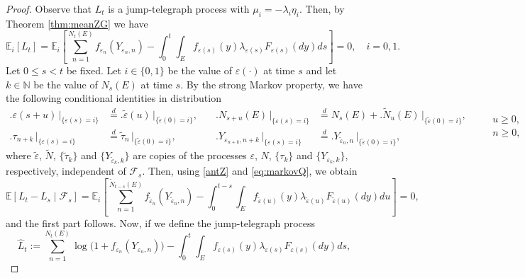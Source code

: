 \documentclass[11pt]{article}
\theoremstyle{plain}
\theoremstyle{definition}
\numberwithin{equation}{section}
\newcommand{\eps}{\varepsilon}
\newcommand{\Na}{\mathds{N}}
\newcommand{\Exp}{\mathds{E}}
\begin{document}
\begin{proof}
Observe that $L_t$ is a jump-telegraph process with $\mu_i=-\lambda_i\eta_i.$ Then, by Theorem \ref{thm:meanZG} we have
\begin{equation}\label{antZ}
\Exp_i[L_t]=\Exp_i\left[\sum_{n=1}^{N_t(E)}f_{\eps_n}(Y_{\eps_n,n})-\int_0^t\int_{E}f_{\eps(s)}(y)\lambda_{\eps(s)}F_{\eps(s)}(d y)d s\right]=0,\quad i=0,1.
\end{equation}
Let $0\le s < t$ be fixed. Let $i\in\{0,1\}$ be the value of $\eps(\cdot)$ at time $s$ and let $k\in\Na$ be the value of $N_s(E)$ at time $s.$ By the strong Markov property, we have the following conditional identities in distribution
\begin{equation}\label{eq:markovQ}
\begin{aligned}
\bigl.\eps(s+u)\,\bigr|_{\{\eps(s)=i\}}&\overset{d}{=}\bigl.\tilde{\eps}(u)\,\bigr|_{\{\tilde{\eps}(0)=i\}}, \\
\bigl.\tau_{n+k}\,\bigr|_{\{\eps(s)=i\}}&\overset{d}{=}\tilde{\tau}_{n}\,\bigr|_{\{\tilde{\eps}(0)=i\}},
\end{aligned}
\quad
\begin{aligned}
\bigl.N_{s+u}(E)\,\bigr|_{\{\eps(s)=i\}}&\overset{d}{=}N_s(E)+\bigl.\widetilde{N}_u(E)\,\bigr|_{\{\tilde{\eps}(0)=i\}}, \\
\bigl.Y_{\eps_{n+k},n+k}\,\bigr|_{\{\eps(s)=i\}}&\overset{d}{=}\bigl.Y_{\tilde{\eps}_n,n}\,\bigr|_{\{\tilde{\eps}(0)=i\}},
\end{aligned}
\quad
\begin{aligned}
&u\geq0,\\
&n\geq0,
\end{aligned}
\end{equation}
where $\tilde{\eps}$, $\widetilde{N}$, $\{\tilde{\tau}_k\}$ and $\{Y_{\tilde{\eps}_k,k}\}$
are copies of the processes $\eps$, $N$, $\{\tau_k\}$ and $\{Y_{\eps_k,k}\}$, respectively, independent of $\mathcal{F}_s.$
Then, using \eqref{antZ} and \eqref{eq:markovQ}, we obtain
\begin{equation*}
\Exp[L_t-L_s\mid\mathcal{F}_s]
=\Exp_i\left[\sum_{n=1}^{\widetilde{N}_{t-s}(E)}f_{\tilde{\eps}_n}(Y_{\tilde{\eps}_n,n})
-\int_0^{t-s}\int_{E}f_{\tilde{\eps}(u)}(y)\lambda_{\tilde{\eps}(u)}F_{\tilde{\eps}(u)}(d y)d u\right]
= 0,
\end{equation*}
and the first part follows. Now, if we define the jump-telegraph process
\begin{equation*}
\hat{L}_t:=\sum_{n=1}^{N_t(E)}\log\bigl(1+f_{\eps_n}(Y_{\eps_n,n})\bigr)-\int_0^t\int_{E}f_{\eps(s)}(y)\lambda_{\eps(s)}F_{\eps(s)}(dy)ds,

\end{equation*}
\end{proof}
\end{document}

